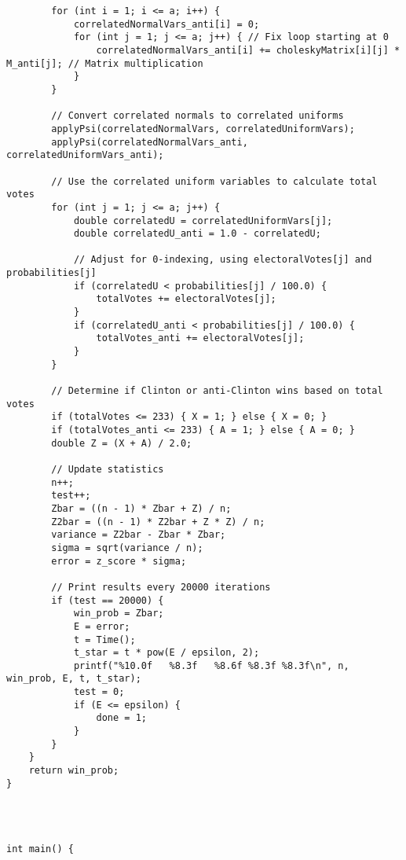 \documentclass{report}
\begin{document}
\begin{lstlisting}
        for (int i = 1; i <= a; i++) {
            correlatedNormalVars_anti[i] = 0;
            for (int j = 1; j <= a; j++) { // Fix loop starting at 0
                correlatedNormalVars_anti[i] += choleskyMatrix[i][j] * M_anti[j]; // Matrix multiplication
            }
        }

        // Convert correlated normals to correlated uniforms
        applyPsi(correlatedNormalVars, correlatedUniformVars);
        applyPsi(correlatedNormalVars_anti, correlatedUniformVars_anti);

        // Use the correlated uniform variables to calculate total votes
        for (int j = 1; j <= a; j++) {
            double correlatedU = correlatedUniformVars[j];
            double correlatedU_anti = 1.0 - correlatedU;

            // Adjust for 0-indexing, using electoralVotes[j] and probabilities[j]
            if (correlatedU < probabilities[j] / 100.0) {
                totalVotes += electoralVotes[j];
            }
            if (correlatedU_anti < probabilities[j] / 100.0) {
                totalVotes_anti += electoralVotes[j];
            }
        }

        // Determine if Clinton or anti-Clinton wins based on total votes
        if (totalVotes <= 233) { X = 1; } else { X = 0; }
        if (totalVotes_anti <= 233) { A = 1; } else { A = 0; }
        double Z = (X + A) / 2.0;

        // Update statistics
        n++;
        test++;
        Zbar = ((n - 1) * Zbar + Z) / n;
        Z2bar = ((n - 1) * Z2bar + Z * Z) / n;
        variance = Z2bar - Zbar * Zbar;
        sigma = sqrt(variance / n);
        error = z_score * sigma;

        // Print results every 20000 iterations
        if (test == 20000) {
            win_prob = Zbar;
            E = error;
            t = Time();
            t_star = t * pow(E / epsilon, 2);
            printf("%10.0f   %8.3f   %8.6f %8.3f %8.3f\n", n, win_prob, E, t, t_star);
            test = 0;
            if (E <= epsilon) {
                done = 1;
            }
        }
    }
    return win_prob;
}




int main() {


\end{lstlisting}
\end{document}
